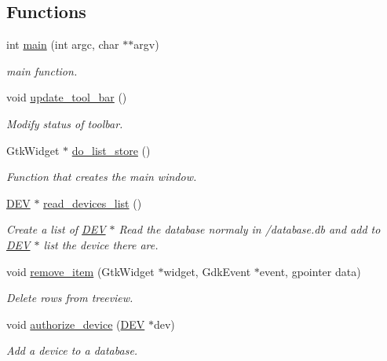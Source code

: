 \subsection*{Functions}
\begin{DoxyCompactItemize}
\item 
int \hyperlink{usb-gui_8c_a3c04138a5bfe5d72780bb7e82a18e627}{main} (int argc, char $\ast$$\ast$argv)
\begin{DoxyCompactList}\small\item\em main function. \item\end{DoxyCompactList}\item 
void \hyperlink{usb-gui_8c_a3893dfbb92994b551fb34e396c26f5d1}{update\_\-tool\_\-bar} ()
\begin{DoxyCompactList}\small\item\em Modify status of toolbar. \item\end{DoxyCompactList}\item 
GtkWidget $\ast$ \hyperlink{usb-gui_8c_a9ebf0061334dc756aae09069c0e2722d}{do\_\-list\_\-store} ()
\begin{DoxyCompactList}\small\item\em Function that creates the main window. \item\end{DoxyCompactList}\item 
\hyperlink{structDEV}{DEV} $\ast$ \hyperlink{usb-gui_8c_ad3b58eac54be6a412e7d9ec99857d313}{read\_\-devices\_\-list} ()
\begin{DoxyCompactList}\small\item\em Create a list of \hyperlink{structDEV}{DEV} $\ast$ Read the database normaly in /database.db and add to \hyperlink{structDEV}{DEV} $\ast$ list the device there are. \item\end{DoxyCompactList}\item 
void \hyperlink{usb-gui_8c_adebdd69140dd995853b3d4a40de3c058}{remove\_\-item} (GtkWidget $\ast$widget, GdkEvent $\ast$event, gpointer data)
\begin{DoxyCompactList}\small\item\em Delete rows from treeview. \item\end{DoxyCompactList}\item 
void \hyperlink{usb-gui_8c_a36cb198a8cc3b38c2ee2cd9f50b97d67}{authorize\_\-device} (\hyperlink{structDEV}{DEV} $\ast$dev)
\begin{DoxyCompactList}\small\item\em Add a device to a database. \item\end{DoxyCompactList}\item 
$$
\end{DoxyCompactItemize}
